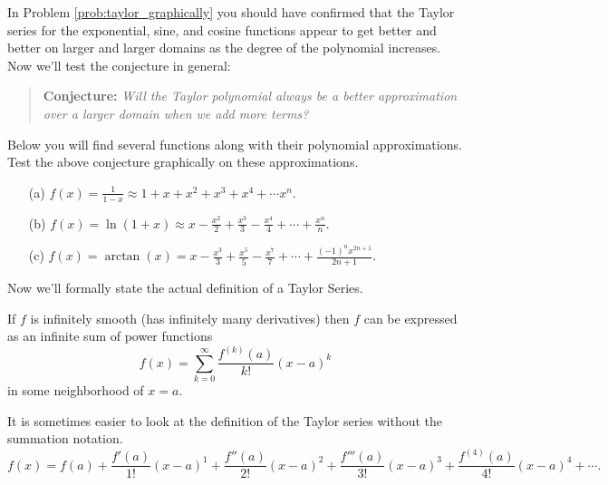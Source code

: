 \begin{problem}\label{prob:taylor_graphically2}
    In Problem \ref{prob:taylor_graphically} you should have confirmed that the Taylor
    series for the exponential, sine, and cosine functions appear to get better and better
    on larger and larger domains as the degree of the polynomial increases.  Now we'll
    test the conjecture in general:
    \begin{quote}
        {\bf Conjecture: } {\it Will the Taylor polynomial always be a better approximation over a larger
        domain when we add more terms?}
    \end{quote}
    Below you will find several functions along with their polynomial approximations.
    Test the above conjecture graphically on these approximations.
    \begin{enumerate}
        \item[(a)] $\displaystyle f(x) = \frac{1}{1-x} \approx 1 + x + x^2 + x^3 + x^4 +
            \cdots x^n.$
        \item[(b)] $\displaystyle f(x) = \ln(1+x) \approx x - \frac{x^2}{2} +
            \frac{x^3}{3} - \frac{x^4}{4} + \cdots + \frac{x^n}{n}.$
        \item[(c)] $\displaystyle f(x) = \arctan(x) = x - \frac{x^3}{3} +
            \frac{x^5}{5} - \frac{x^7}{7} + \cdots + \frac{(-1)^n x^{2n+1} }{2n+1}.$
    \end{enumerate}
\end{problem}

Now we'll formally state the actual definition of a Taylor Series.  
\begin{definition}\label{def:taylor}
If $f$ is
infinitely smooth (has infinitely many derivatives) then $f$ can be expressed as an
infinite sum of power functions
\[ f(x) = \sum_{k=0}^\infty \frac{f^{(k)}(a)}{k!}(x-a)^k \]
in some neighborhood of $x=a$. 
\end{definition}
It is sometimes easier to look at the definition of the Taylor series without the
summation notation.  
\[ f(x) = f(a) + \frac{f'(a)}{1!}(x-a)^1 + \frac{f''(a)}{2!}(x-a)^2 +
\frac{f'''(a)}{3!}(x-a)^3 + \frac{f^{(4)}(a)}{4!}(x-a)^4 + \cdots. \]

